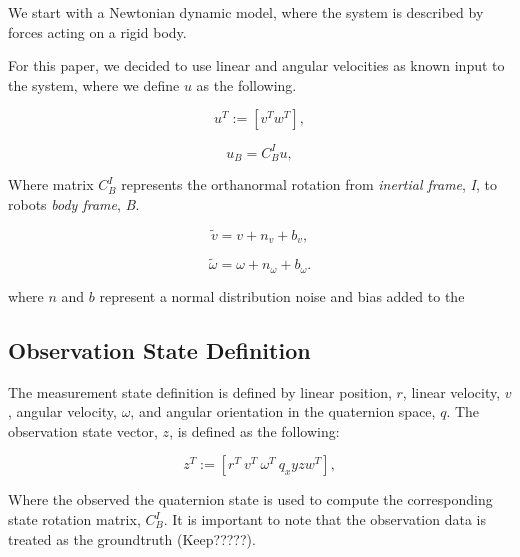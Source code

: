 \documentclass[letterpaper, 10 pt, conference]{ieeeconf}  %
\newcommand{\transpose}[1]{\ensuremath{#1^{\scriptscriptstyle T}}}
\begin{document}
We start with a Newtonian dynamic model, where the system is described by forces
acting on a rigid body.


For this paper, we decided to use linear and angular velocities as known input
to the system, where we define $u$ as the following.

\begin{equation}
\label{eq:1}
\transpose{u} := \left[ \transpose{v} \transpose{w} \right],
\end{equation}

\begin{equation}
\label{eq:2}
u_{B} = {C}^{I}_{B} u,
\end{equation}


Where matrix ${C}^{I}_{B}$ represents the orthanormal rotation from \textit{inertial frame},
\textit{I}, to robots \textit{body frame}, \textit{B}.



\begin{equation}
\label{eq:3}
\widetilde{v}= v + n_{v} + b_{v},
\end{equation}


\begin{equation}
\label{eq:4}
\widetilde{\omega} = \omega + n_{\omega} + b_{\omega}.
\end{equation}

where $n$ and $b$ represent a normal distribution noise and bias added to the







\subsection{Observation State Definition}

The measurement state definition is defined by linear position, $r$, linear
velocity, $v$, angular velocity, $\omega$, and angular orientation in the quaternion
space, $q$. The observation state vector, $z$, is defined as the following:

\begin{equation}
\label{eq:4}
\transpose{z} :=  \left[\transpose{r}~\transpose{v}~\transpose{\omega}~\transpose{q_xyzw} \right],
\end{equation}


Where the observed the quaternion state is used to compute the corresponding state
rotation matrix, ${C}^{I}_{B}$.
It is important to note that the observation data is treated as the groundtruth (Keep?????).
\end{document}
